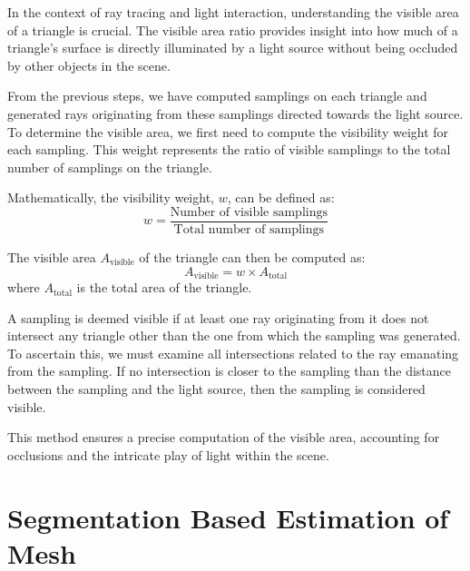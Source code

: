 \documentclass[11pt, a4paper,oneside,chapterprefix=false]{scrbook}
\begin{document}
In the context of ray tracing and light interaction, understanding the visible area of a triangle is crucial. The visible area ratio provides insight into how much of a triangle's surface is directly illuminated by a light source without being occluded by other objects in the scene.

\vspace{10pt}

From the previous steps, we have computed samplings on each triangle and generated rays originating from these samplings directed towards the light source. To determine the visible area, we first need to compute the visibility weight for each sampling. This weight represents the ratio of visible samplings to the total number of samplings on the triangle.

\vspace{10pt}

Mathematically, the visibility weight, \( w \), can be defined as:
\begin{equation}
    w = \frac{\text{Number of visible samplings}}{\text{Total number of samplings}}
\end{equation}

The visible area \( A_{\text{visible}} \) of the triangle can then be computed as:
\begin{equation}
    A_{\text{visible}} = w \times A_{\text{total}}
\end{equation}
where \( A_{\text{total}} \) is the total area of the triangle.

A sampling is deemed visible if at least one ray originating from it does not intersect any triangle other than the one from which the sampling was generated. To ascertain this, we must examine all intersections related to the ray emanating from the sampling. If no intersection is closer to the sampling than the distance between the sampling and the light source, then the sampling is considered visible.

\vspace{10pt}

This method ensures a precise computation of the visible area, accounting for occlusions and the intricate play of light within the scene.
 
\section{Segmentation Based Estimation of Mesh} \label{sec:region growing mesh estimation}
\end{document}
